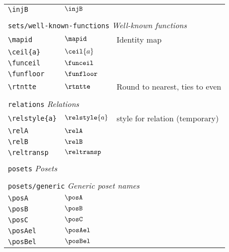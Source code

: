 \begin{longtable}{lll}
 {\color[rgb]{0.5,0.5,0.5}\texttt{\textbackslash injB}} & $\injB$ & \\ 
  &  & \\ 
 \multicolumn{3}{l}{{\color[rgb]{0.5,0.5,0.5}\texttt{sets/well-known-functions}} \emph{Well-known functions}}\\ 
 \hline
{\color[rgb]{0.5,0.5,0.5}\texttt{\textbackslash mapid}} & $\mapid$ &  Identity map\\ 
 {\color[rgb]{0.5,0.5,0.5}\texttt{\textbackslash ceil\{a\}}} & $\ceil{a}$ & \\ 
 {\color[rgb]{0.5,0.5,0.5}\texttt{\textbackslash funceil}} & $\funceil$ & \\ 
 {\color[rgb]{0.5,0.5,0.5}\texttt{\textbackslash funfloor}} & $\funfloor$ & \\ 
 {\color[rgb]{0.5,0.5,0.5}\texttt{\textbackslash rtntte}} & $\rtntte$ &  Round to nearest, ties to even\\ 
  &  & \\ 
 \multicolumn{3}{l}{{\color[rgb]{0.5,0.5,0.5}\texttt{relations}} \emph{Relations}}\\ 
 \hline
\hline
{\color[rgb]{0.5,0.5,0.5}\texttt{\textbackslash relstyle\{a\}}} & $\relstyle{a}$ &  style for relation (temporary)\\ 
 {\color[rgb]{0.5,0.5,0.5}\texttt{\textbackslash relA}} & $\relA$ & \\ 
 {\color[rgb]{0.5,0.5,0.5}\texttt{\textbackslash relB}} & $\relB$ & \\ 
 {\color[rgb]{0.5,0.5,0.5}\texttt{\textbackslash reltransp}} & $\reltransp$ & \\ 
  &  & \\ 
 \multicolumn{3}{l}{{\color[rgb]{0.5,0.5,0.5}\texttt{posets}} \emph{Posets}}\\ 
 \hline
\hline
 &  & \\ 
 \multicolumn{3}{l}{{\color[rgb]{0.5,0.5,0.5}\texttt{posets/generic}} \emph{Generic poset names}}\\ 
 \hline
{\color[rgb]{0.5,0.5,0.5}\texttt{\textbackslash posA}} & $\posA$ & \\ 
 {\color[rgb]{0.5,0.5,0.5}\texttt{\textbackslash posB}} & $\posB$ & \\ 
 {\color[rgb]{0.5,0.5,0.5}\texttt{\textbackslash posC}} & $\posC$ & \\ 
 {\color[rgb]{0.5,0.5,0.5}\texttt{\textbackslash posAel}} & $\posAel$ & \\ 
 {\color[rgb]{0.5,0.5,0.5}\texttt{\textbackslash posBel}} & $\posBel$ & \\ 

\end{longtable}

